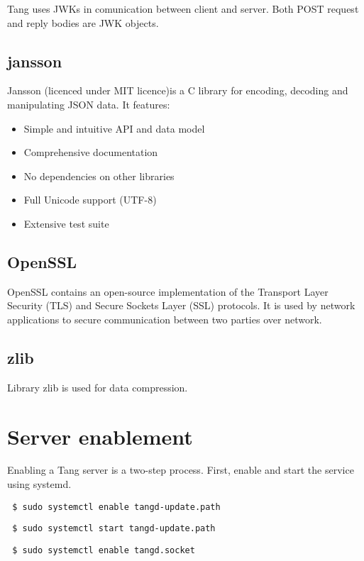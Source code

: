 \documentclass[../xdudla00-porting-Tang-to-Open-WRT.tex]{subfiles}
\begin{document}
Tang uses JWKs in comunication between client and server. Both POST request and reply bodies are JWK objects.

\subsection{jansson}\label{jansson}
Jansson \cite{jansson}(licenced under MIT licence)is a C library for encoding, decoding and manipulating JSON data. It features:
\begin{itemize}

    \item Simple and intuitive API and data model
    \item Comprehensive documentation
    \item No dependencies on other libraries
    \item Full Unicode support (UTF-8)
    \item Extensive test suite
\end{itemize}

\subsection{OpenSSL}\label{openssl}
OpenSSL \cite{openssl} contains an open-source implementation of the Transport Layer Security (TLS) and Secure Sockets Layer (SSL) protocols. It is used by network applications to secure communication between two parties over network.

\subsection{zlib}\label{zlib}
Library zlib \cite{zlib} is used for data compression.

\section{Server enablement}
Enabling a Tang server is a two-step process.
First, enable and start the service using systemd.

{\tt\begin{verbatim} $ sudo systemctl enable tangd-update.path\end{verbatim}
}

{\tt\begin{verbatim} $ sudo systemctl start tangd-update.path\end{verbatim}
}

{\tt\begin{verbatim} $ sudo systemctl enable tangd.socket\end{verbatim}
}
\end{document}
